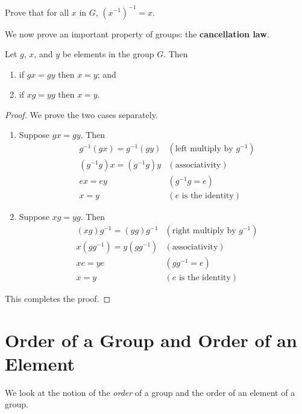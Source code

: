 \begin{exercise}
Prove that for all $x$ in $G$, $\left(x^{-1}\right)^{-1} = x$.
\end{exercise}

We now prove an important property of groups: the \textbf{cancellation law}.
\begin{proposition}
    Let $g$, $x$, and $y$ be elements in the group $G$. Then
    \begin{enumerate}
        \item if $gx=gy$ then $x = y$; and
        \item if $xg=yg$ then $x = y$.
    \end{enumerate}
\end{proposition}
\begin{proof}
    We prove the two cases separately.
    \begin{enumerate}
        \item Suppose $gx = gy$. Then
        \begin{align*}
            &g^{-1}(gx) = g^{-1}(gy) & (\text{left multiply by } g^{-1})\\
            &(g^{-1}g)x = (g^{-1}g)y & (\text{associativity})\\
            &ex = ey & (g^{-1}g = e)\\
            &x = y & (e \text{ is the identity})
        \end{align*}
        \item Suppose $xg = yg$. Then
        \begin{align*}
            &(xg)g^{-1} = (yg)g^{-1} & (\text{right multiply by } g^{-1})\\
            &x(gg^{-1}) = y(gg^{-1}) & (\text{associativity})\\
            &xe = ye & (gg^{-1} = e)\\
            &x = y & (e \text{ is the identity})
        \end{align*}
    \end{enumerate}
    This completes the proof.
\end{proof}

\section{Order of a Group and Order of an Element}
We look at the notion of the \textit{order} of a group and the order of an element of a group.

